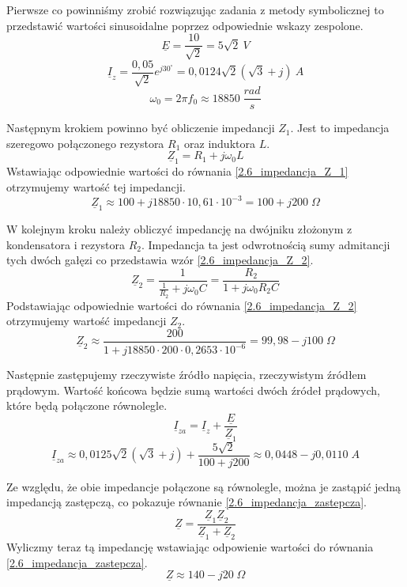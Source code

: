\documentclass[12pt, a4paper]{article}
\begin{document}
Pierwsze co powinniśmy zrobić rozwiązując zadania z metody symbolicznej to
przedstawić wartości sinusoidalne poprzez odpowiednie wskazy zespolone.
$$
  \underline{E} = \frac{10}{\sqrt{2}} = 5\sqrt{2}\: V
$$
$$
  \underline{I}_z = \frac{0,05}{\sqrt{2}}e^{j30^\circ} =0,0124\sqrt{2}(\sqrt{3}+j)\: A
$$
$$
  \omega_0 = 2\pi f_0 \approx 18850\; \frac{rad}{s}
$$

Następnym krokiem powinno być obliczenie impedancji $Z_1$. Jest to impedancja
szeregowo połączonego rezystora $R_1$ oraz induktora $L$.
\begin{equation}\label{2.6_impedancja_Z_1}
  \underline{Z}_1 = R_1+j\omega_0L
\end{equation}
Wstawiając odpowiednie wartości do równania \ref{2.6_impedancja_Z_1} otrzymujemy
wartość tej impedancji.
$$
  \underline{Z}_1 \approx 100 + j18850\cdot10,61\cdot10^{-3} = 100+j200\; \Omega
$$

W kolejnym kroku należy obliczyć impedancję na dwójniku złożonym z kondensatora
i rezystora $R_2$. Impedancja ta jest odwrotnością sumy admitancji tych dwóch
gałęzi co przedstawia wzór \ref{2.6_impedancja_Z_2}.
\begin{equation}\label{2.6_impedancja_Z_2}
  \underline{Z}_2 = \frac{1}{\frac{1}{R_2}+j\omega_0C} = \frac{R_2}{1+j\omega_0R_2C}
\end{equation}
Podstawiając odpowiednie wartości do równania \ref{2.6_impedancja_Z_2}
otrzymujemy wartość impedancji $Z_2$.
$$
  \underline{Z}_2 \approx \frac{200}{1+j18850\cdot200\cdot0,2653\cdot10^{-6}} =
  99,98-j100\; \Omega
$$

Następnie zastępujemy rzeczywiste źródło napięcia, rzeczywistym źródłem prądowym.
Wartość końcowa będzie sumą wartości dwóch źródeł prądowych, które będą
połączone równolegle.
$$
  \underline{I}_{za} = \underline{I}_z + \frac{\underline{E}}{\underline{Z}_1}
$$
$$
  \underline{I}_{za} \approx 0,0125\sqrt{2}\left(\sqrt{3}+j\right) +
  \frac{5\sqrt{2}}{100+j200} \approx 0,0448-j0,0110\; A
$$

Ze względu, że obie impedancje połączone są równolegle, można je zastąpić jedną
impedancją zastępczą, co pokazuje równanie \ref{2.6_impedancja_zastepcza}.
\begin{equation}\label{2.6_impedancja_zastepcza}
  \underline{Z} = \frac{\underline{Z}_1\underline{Z}_2}{\underline{Z}_1+\underline{Z}_2}
\end{equation}
Wyliczmy teraz tą impedancję wstawiając odpowienie wartości do równania
\ref{2.6_impedancja_zastepcza}.
$$
  \underline{Z} \approx 140 - j20\; \Omega
$$
\end{document}
